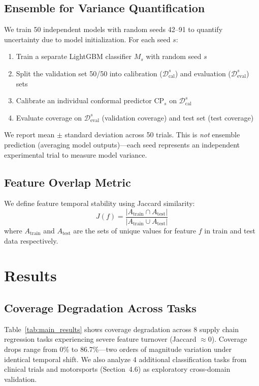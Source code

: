 \documentclass[sigconf]{acmart}
\begin{document}
\subsection{Ensemble for Variance Quantification}

We train 50 independent models with random seeds 42--91 to quantify uncertainty
due to model initialization. For each seed $s$:

\begin{enumerate}
    \item Train a separate LightGBM classifier $M_s$ with random seed $s$
    \item Split the validation set 50/50 into calibration ($\mathcal{D}_{\text{cal}}^s$)
          and evaluation ($\mathcal{D}_{\text{eval}}^s$) sets
    \item Calibrate an individual conformal predictor $\text{CP}_s$ on $\mathcal{D}_{\text{cal}}^s$
    \item Evaluate coverage on $\mathcal{D}_{\text{eval}}^s$ (validation coverage)
          and test set (test coverage)
\end{enumerate}

We report mean $\pm$ standard deviation across 50 trials. This is \textit{not}
ensemble prediction (averaging model outputs)---each seed represents an
independent experimental trial to measure model variance.

\subsection{Feature Overlap Metric}

We define feature temporal stability using Jaccard similarity:
\begin{equation}
J(f) = \frac{|A_{\text{train}} \cap A_{\text{test}}|}{|A_{\text{train}} \cup A_{\text{test}}|}
\end{equation}
where $A_{\text{train}}$ and $A_{\text{test}}$ are the sets of unique values for feature $f$ in train and test data respectively.

\section{Results}

\subsection{Coverage Degradation Across Tasks}

Table~\ref{tab:main_results} shows coverage degradation across 8 supply chain regression tasks experiencing severe feature turnover (Jaccard $\approx$0). Coverage drops range from 0\% to 86.7\%---two orders of magnitude variation under identical temporal shift. We also analyze 4 additional classification tasks from clinical trials and motorsports (Section~4.6) as exploratory cross-domain validation.
\end{document}
